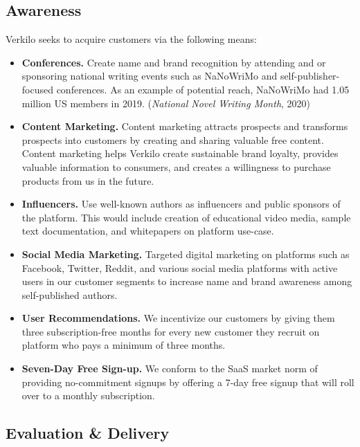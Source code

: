 \documentclass[10pt,openany]{book}
\providecommand{\tightlist}{%
  \setlength{\itemsep}{0pt}\setlength{\parskip}{0pt}}
\begin{document}
\hypertarget{awareness}{%
\subsection{Awareness}\label{awareness}}

Verkilo seeks to acquire customers via the following means:

\begin{itemize}
\tightlist
\item
  \textbf{Conferences.} Create name and brand recognition by attending
  and or sponsoring national writing events such as NaNoWriMo and
  self-publisher-focused conferences. As an example of potential reach,
  NaNoWriMo had 1.05 million US members in 2019. (\emph{National Novel
  Writing Month}, 2020)
\item
  \textbf{Content Marketing.} Content marketing attracts prospects and
  transforms prospects into customers by creating and sharing valuable
  free content. Content marketing helps Verkilo create sustainable brand
  loyalty, provides valuable information to consumers, and creates a
  willingness to purchase products from us in the future.
\item
  \textbf{Influencers.} Use well-known authors as influencers and public
  sponsors of the platform. This would include creation of educational
  video media, sample text documentation, and whitepapers on platform
  use-case.
\item
  \textbf{Social Media Marketing.} Targeted digital marketing on
  platforms such as Facebook, Twitter, Reddit, and various social media
  platforms with active users in our customer segments to increase name
  and brand awareness among self-published authors.
\item
  \textbf{User Recommendations.} We incentivize our customers by giving
  them three subscription-free months for every new customer they
  recruit on platform who pays a minimum of three months.
\item
  \textbf{Seven-Day Free Sign-up.} We conform to the SaaS market norm of
  providing no-commitment signups by offering a 7-day free signup that
  will roll over to a monthly subscription.
\end{itemize}

\hypertarget{evaluation-delivery}{%
\subsection{Evaluation \& Delivery}\label{evaluation-delivery}}
\end{document}
